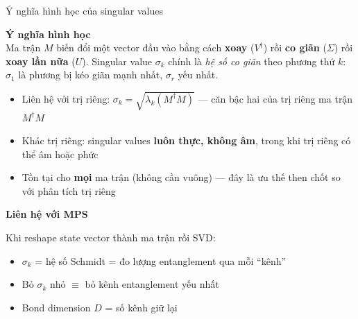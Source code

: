 \documentclass[aspectratio=169, 11pt]{beamer}
\begin{document}
\begin{frame}[shrink=3]{Ý nghĩa hình học của singular values}

\textcolor{qpurple}{\textbf{Ý nghĩa hình học}}\\[3pt]
{\small Ma trận $M$ biến đổi một vector đầu vào bằng cách \textbf{xoay} ($V^\dagger$) rồi \textbf{co giãn} ($\Sigma$) rồi \textbf{xoay lần nữa} ($U$).
Singular value $\sigma_k$ chính là \textit{hệ số co giãn} theo phương thứ $k$: $\sigma_1$ là phương bị kéo giãn mạnh nhất, $\sigma_r$ yếu nhất.}

\vspace{8pt}
{\small
\begin{itemize}
  \item Liên hệ với trị riêng: $\sigma_k = \sqrt{\lambda_k(M^\dagger M)}$ — căn bậc hai của trị riêng ma trận $M^\dagger M$
  \item Khác trị riêng: singular values \textbf{luôn thực, không âm}, trong khi trị riêng có thể âm hoặc phức
  \item Tồn tại cho \textbf{mọi} ma trận (không cần vuông) — đây là ưu thế then chốt so với phân tích trị riêng
\end{itemize}}

\vspace{8pt}
\textcolor{qcyan}{\textbf{Liên hệ với MPS}}\\[3pt]
{\small Khi reshape state vector thành ma trận rồi SVD:
\begin{itemize}
  \item $\sigma_k$ = hệ số Schmidt = đo lượng entanglement qua mỗi ``kênh''
  \item Bỏ $\sigma_k$ nhỏ $\equiv$ bỏ kênh entanglement yếu nhất
  \item Bond dimension $D$ = số kênh giữ lại
\end{itemize}}

\end{frame}
\end{document}
